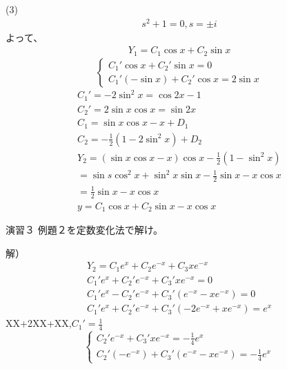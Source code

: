 \documentclass{jsarticle}
\begin{document}
(3)
\begin{eqnarray}
s^2+1=0,s=\pm i
\end{eqnarray}
よって、
\begin{eqnarray}
Y_1=C_1\cos x+C_2\sin x
\end{eqnarray}
\begin{displaymath}
\left\{
\begin{array}{l}
C_1'\cos x+C_2'\sin x=0  \\
C_1'(-\sin x)+C_2'\cos x=2\sin x
\end{array}
\right.
\end{displaymath}
\begin{eqnarray}
C_1'=-2\sin ^2x=\cos 2x-1\\
C_2'=2\sin x\cos x=\sin 2x\\
C_1=\sin x\cos x -x+D_1\\
C_2=-\frac{1}{2}(1-2\sin^2x)+D_2\\
Y_2=(\sin x\cos x -x)\cos x -\frac{1}{2}(1-\sin^2x)\\
=\sin s\cos^2x+\sin^2x\sin x-\frac{1}{2}\sin x -x\cos x\\
=\frac{1}{2}\sin x -x\cos x\\
y=C_1\cos x+C_2\sin x-x\cos x
\end{eqnarray}
\begin{itembox}[l]{演習３}
例題２を定数変化法で解け。
\end{itembox}
解）
\begin{eqnarray}
Y_2=C_1e^x+C_2e^{-x}+C_3xe^{-x}\\
C_1'e^x+C_2'e^{-x}+C_3'xe^{-x}=0\\
C_1'e^x-C_2'e^{-x}+C_3'(e^{-x}-xe^{-x})=0\\
C_1'e^x+C_2'e^{-x}+C_3'(-2e^{-x}+xe^{-x})=e^x
\end{eqnarray}
XX+2XX+XX,$C_1'=\frac{1}{4}$
\begin{displaymath}
\left\{
\begin{array}{l}
C_2'e^{-x}+C_3'xe^{-x}=-\frac{1}{4}e^x  \\
C_2'(-e^{-x})+C_3'(e^{-x}-xe^{-x})=-\frac{1}{4}e^x
\end{array}
\right.
\end{displaymath}
\end{document}
